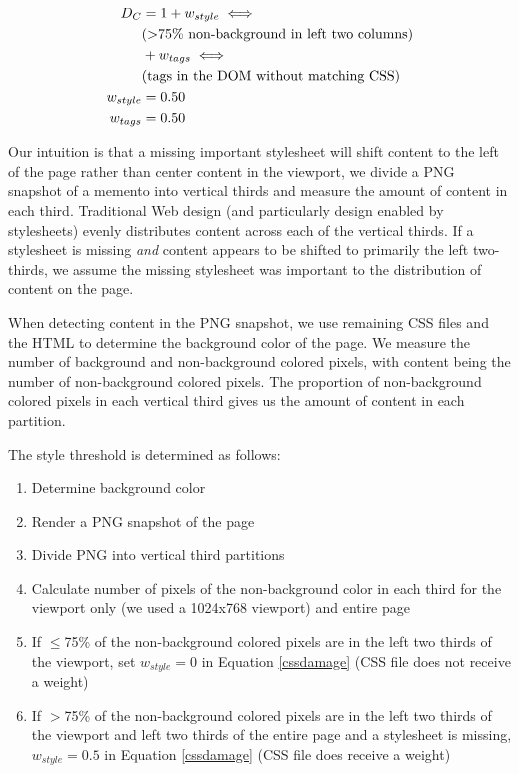 \begin{equation}
\label{cssdamage}
\begin{split}
D_C &= 1 + w_{style} \iff\\&(\text{\textgreater 75\% non-background in
 left two columns}) 
\\& + w_{tags} \iff\\&(\text{tags in the DOM
 without matching CSS})\\
w_{style} &= 0.50\\
w_{tags} &= 0.50
\end{split}
\end{equation}


Our intuition is that a missing important stylesheet will shift content to the left of the page rather than center content in the viewport, we divide a PNG snapshot of a memento into vertical thirds and measure the amount of content in each third. Traditional Web design (and particularly design enabled by stylesheets) evenly distributes content across each of the vertical thirds. If a stylesheet is missing \emph{and} content appears to be shifted to primarily the left two-thirds, we assume the missing stylesheet was important to the distribution of content on the page.

When detecting content in the PNG snapshot, we use remaining CSS files and the HTML to determine the background color of the page. We measure the number of background and non-background colored pixels, with content being the number of non-background colored pixels. The proportion of non-background colored pixels in each vertical third gives us the amount of content in each partition.

The style threshold is determined as follows:

\begin{enumerate}
  \item Determine background color
  \item Render a PNG snapshot of the page
  \item Divide PNG into vertical third partitions
  \item Calculate number of pixels of the non-background color in each third for the viewport only (we used a 1024x768 viewport) and entire page
  \item If $\le$75\% of the non-background colored pixels are in the left two thirds of the viewport, set \emph{$w_{style}=0$} in Equation \ref{cssdamage} (CSS file does not receive a weight)
  \item If $>$75\% of the non-background colored pixels are in the left two thirds of the viewport and left two thirds of the entire page and a stylesheet is missing, \emph{$w_{style}=0.5$} in Equation \ref{cssdamage} (CSS file does receive a weight)
\end{enumerate}

